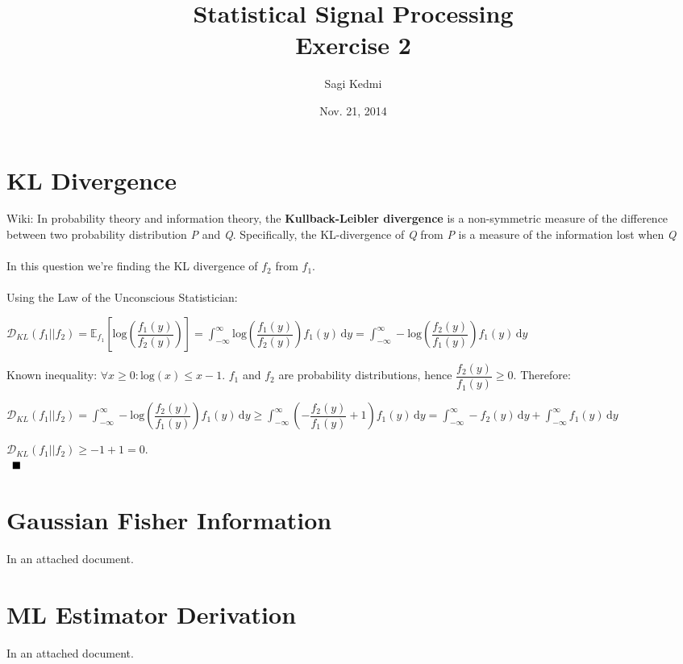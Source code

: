 \documentclass[10pt]{article}
\begin{document}
\title{Statistical Signal Processing\\Exercise 2}
\author{Sagi Kedmi}
\date{Nov. 21, 2014}
\maketitle
\section{KL Divergence}
Wiki: In probability theory and information theory, the \textbf{Kullback-Leibler divergence} is a non-symmetric measure of the difference between two probability distribution \textit{P} and \textit{Q}. Specifically, the KL-divergence of \textit{Q} from \textit{P} is a measure of the information lost when \textit{Q}%
\\\\
In this question we're finding the KL divergence of $f_{2}$ from $f_{1}$.\\\\
Using the Law of the Unconscious Statistician:
\begin{center}
$\mathcal{D}_{KL}\left({f_{1}||f_{2}}\right)=\mathbb{E}_{f_{1}}\left[\mathrm{log}\left({\dfrac{f_{1}(y)}{f_{2}(y)}}\right)\right]={\displaystyle \int_{-\infty}^\infty \mathrm{log}\left({\dfrac{f_{1}(y)}{f_{2}(y)}}\right)f_{1}(y)\,\mathrm{d}y}={\displaystyle \int_{-\infty}^\infty -\mathrm{log}\left({\dfrac{f_{2}(y)}{f_{1}(y)}}\right)f_{1}(y)\,\mathrm{d}y}$
\end{center}
Known inequality: $\forall x\geq 0 : \mathrm{log}(x) \leq x-1$. $f_{1}$ and $f_{2}$ are probability distributions, hence $\dfrac{f_{2}(y)}{f_{1}(y)}\geq 0$. Therefore:
\begin{center}
$\mathcal{D}_{KL}\left({f_{1}||f_{2}}\right)={\displaystyle \int_{-\infty}^\infty -\mathrm{log}\left({\dfrac{f_{2}(y)}{f_{1}(y)}}\right)f_{1}(y)\,\mathrm{d}y}\geq {\displaystyle \int_{-\infty}^\infty \left(-{\dfrac{f_{2}(y)}{f_{1}(y)}} + 1\right)f_{1}(y)\,\mathrm{d}y}={\displaystyle \int_{-\infty}^\infty -f_{2}(y)\,\mathrm{d}y}+{\displaystyle \int_{-\infty}^\infty f_{1}(y)\,\mathrm{d}y}$
\end{center}
\begin{center}
$\mathcal{D}_{KL}\left({f_{1}||f_{2}}\right)\geq -1 +1 = 0.$\\\
$\hfill \blacksquare$
\end{center}
\section{Gaussian Fisher Information}
In an attached document.
\section{ML Estimator Derivation}
In an attached document.
\end{document}
